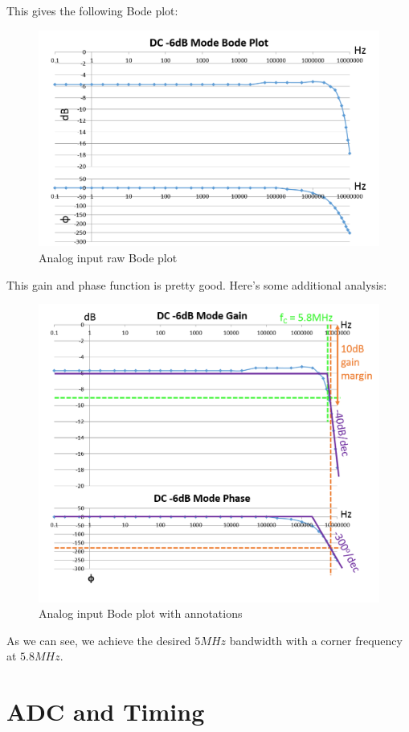 \newpage
This gives the following Bode plot:

\begin{figure}[ht!]
    \centering
    \includegraphics[width=4.5in]{specs/bode_raw.png}
		\caption{Analog input raw Bode plot}
\end{figure}

This gain and phase function is pretty good. Here's some additional analysis:

\begin{figure}[ht!]
    \centering
    \includegraphics[width=4.5in]{specs/bode_total.png}
		\caption{Analog input Bode plot with annotations}
\end{figure}

As we can see, we achieve the desired $5MHz$ bandwidth with a corner frequency at $5.8MHz$.

\newpage
\section{ADC and Timing}

